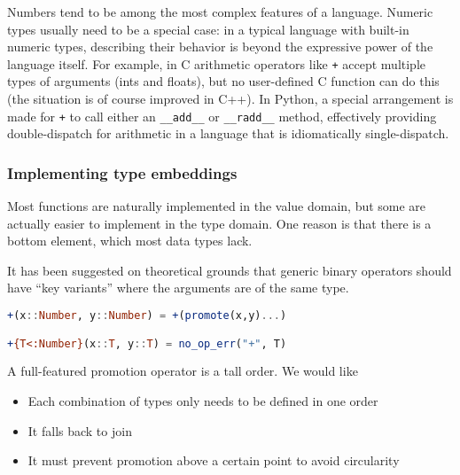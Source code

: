 

Numbers tend to be among the most complex features of a language.
Numeric types usually need to be a special case: in a typical language with
built-in numeric types, describing their behavior is beyond the expressive power
of the language itself.
For example, in C arithmetic operators like \texttt{+} accept multiple types of
arguments (ints and floats), but no user-defined C function can do this (the situation
is of course improved in C++).
In Python, a special arrangement is made for \texttt{+} to call either an
\texttt{\_\_add\_\_} or \texttt{\_\_radd\_\_} method,
effectively providing double-dispatch for arithmetic in a language that is
idiomatically single-dispatch.

\subsubsection{Implementing type embeddings}
\label{sec:promotion}

Most functions are naturally implemented in the value domain, but some are
actually easier to implement in the type domain.
One reason is that there is a bottom element, which most data types lack.

It has been suggested on theoretical grounds \cite{categorytheoryoperators}
that generic binary operators should have ``key variants'' where the
arguments are of the same type.

\begin{singlespace}
\begin{lstlisting}[language=julia]
+(x::Number, y::Number) = +(promote(x,y)...)

+{T<:Number}(x::T, y::T) = no_op_err("+", T)
\end{lstlisting}
\end{singlespace}

\noindent
A full-featured promotion operator is a tall order.
We would like

\begin{itemize}
\item Each combination of types only needs to be defined in one order
\item It falls back to join
\item It must prevent promotion above a certain point to avoid circularity
\end{itemize}

